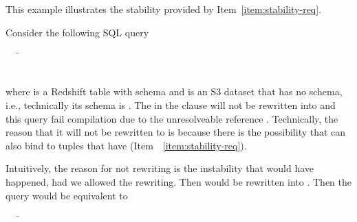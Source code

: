 {

\begin{example}
This example illustrates the stability provided by
Item~\ref{item:stability-req}.

Consider the following SQL query

\begin{tabbing}
\ \ \ \=\\
\>\\
\>
\end{tabbing}

\noindent where  is a Redshift table with schema  and  is an S3 dataset that has no schema, i.e.,
technically its schema is . The  in the  clause will not
be rewritten into  and this query fail compilation due to the
unresolveable reference . Technically, the reason that it will not be
rewritten to  is because there is the possibility that  can also
bind to tuples that have  (Item~~\ref{item:stability-req}).

Intuitively, the reason for not rewriting is the instability that would have
happened, had we allowed the rewriting. Then  would be rewritten into
. Then the query would be equivalent to 

\begin{tabbing}
\ \ \ \=\\
\>\\
\>
\end{tabbing}


\end{example}}
